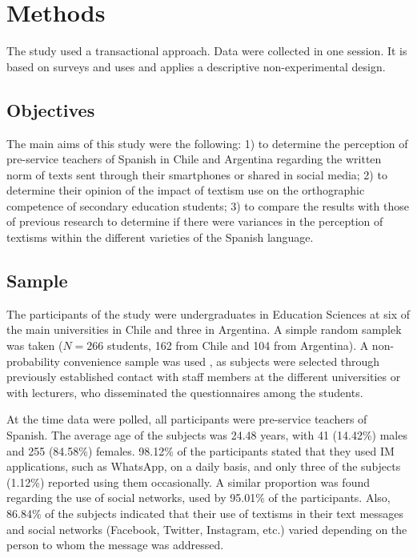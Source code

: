 \documentclass[english]{textolivre}
\begin{document}
\section{Methods}\label{Methods}
The study used a transactional approach. Data were collected in one session. It is based on surveys and uses and applies a descriptive non-experimental design.

\subsection{Objectives}
The main aims of this study were the following: 1) to determine the perception of pre-service teachers of Spanish in Chile and Argentina regarding the written norm of texts sent through their smartphones or shared in social media; 2) to determine their opinion of the impact of textism use on the orthographic competence of secondary education students; 3) to compare the results with those of previous research to determine if there were variances in the perception of textisms within the different varieties of the Spanish language.

\subsection{Sample}
The participants of the study were undergraduates in Education Sciences at six of the main universities in Chile and three in Argentina. A simple random samplek was taken ($N= 266$ students, 162 from Chile and 104 from Argentina). A non-probability convenience sample was used \cite{SabariegoPuig2004}, as subjects were selected through previously established contact with staff members at the different universities or with lecturers, who disseminated the questionnaires among the students.

At the time data were polled, all participants were pre-service teachers of Spanish. The average age of the subjects was 24.48 years, with 41 (14.42\%) males and 255 (84.58\%) females. 98.12\% of the participants stated that they used IM applications, such as WhatsApp, on a daily basis, and only three of the subjects (1.12\%) reported using them occasionally. A similar proportion was found regarding the use of social networks, used by 95.01\% of the participants. Also, 86.84\% of the subjects indicated that their use of textisms in their text messages and social networks (Facebook, Twitter, Instagram, etc.) varied depending on the person to whom the message was addressed.  
\end{document}
